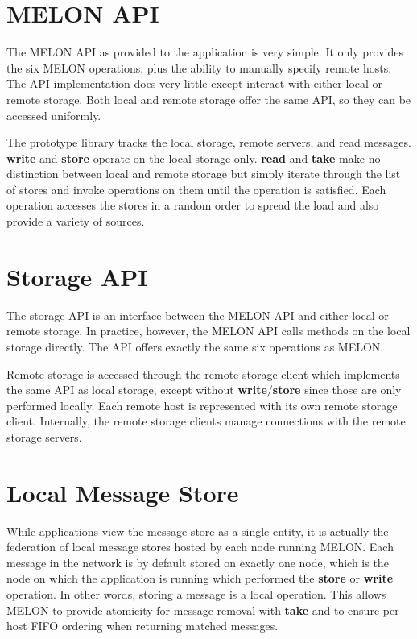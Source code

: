 \section{MELON API}

The MELON API as provided to the application is very simple. It only provides the six MELON operations, plus the ability to manually specify remote hosts. The API implementation does very little except interact with either local or remote storage. Both local and remote storage offer the same API, so they can be accessed uniformly.

The prototype library tracks the local storage, remote servers, and read messages. \textbf{write} and \textbf{store} operate on the local storage only. \textbf{read} and \textbf{take} make no distinction between local and remote storage but simply iterate through the list of stores and invoke operations on them until the operation is satisfied. Each operation accesses the stores in a random order to spread the load and also provide a variety of sources.

\section{Storage API}

The storage API is an interface between the MELON API and either local or remote storage. In practice, however, the MELON API calls methods on the local storage directly. The API offers exactly the same six operations as MELON.

Remote storage is accessed through the remote storage client which implements the same API as local storage, except without \textbf{write}/\textbf{store} since those are only performed locally. Each remote host is represented with its own remote storage client. Internally, the remote storage clients manage connections with the remote storage servers.

\section{Local Message Store}\label{impl:localstore}

While applications view the message store as a single entity, it is actually the federation of local message stores hosted by each node running MELON. Each message in the network is by default stored on exactly one node, which is the node on which the application is running which performed the \textbf{store} or \textbf{write} operation. In other words, storing a message is a local operation. This allows MELON to provide atomicity for message removal with \textbf{take} and to ensure per-host FIFO ordering when returning matched messages.

